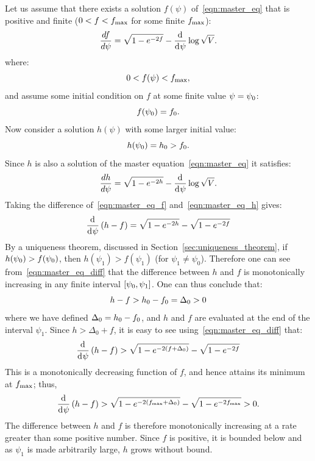 Let us assume that there exists a solution $f(\psi)$ of~\eqref{eqn:master_eq} that is positive and finite ($0<f<f_\mathrm{max}$ for some finite $f_\mathrm{max}$):
%
\begin{equation}
  \frac{d f}{d \psi} = \sqrt{1-e^{-2f}} -\frac{\operatorname{d}^{}\!{}}{\operatorname{d}^{}\!{\psi}}\log \sqrt V.
  \label{eqn:master_eq_f}
\end{equation}
%
where:
%
\begin{equation}
  0<f(\psi)<f_\mathrm{max},
\end{equation}
%
and assume some initial condition on $f$ at some finite value
$\psi=\psi_0$:
%
\begin{equation}
  f(\psi_0)=f_0.
\end{equation}
%
Now consider a solution $h(\psi)$ with some larger initial value:
%
\begin{equation}
  h(\psi_0)=h_0>f_0.
\end{equation}
%
Since $h$ is also a solution of the master equation~\eqref{eqn:master_eq} it satisfies:
%
\begin{equation}
  \frac{d h}{d \psi} = \sqrt{1-e^{-2h}} -\frac{\operatorname{d}^{}\!{}}{\operatorname{d}^{}\!{\psi}}\log \sqrt V.
  \label{eqn:master_eq_h}
\end{equation}
%
Taking the difference of~\eqref{eqn:master_eq_f} and~\eqref{eqn:master_eq_h} gives:
%
\begin{equation}
  \frac{\operatorname{d}^{}\!{}}{\operatorname{d}^{}\!{\psi}}\left(h-f\right)
  = 
  \sqrt{1-e^{-2h}}-\sqrt{1-e^{-2f}}
  \label{eqn:master_eq_diff}
\end{equation}
%
By a uniqueness theorem, discussed in Section~\ref{sec:uniqueness_theorem}, if $h(\psi_0)>f(\psi_0)$, then $h(\psi_1)>f(\psi_1)$ (for $\psi_1\ne\psi_0$). Therefore one can see from~\eqref{eqn:master_eq_diff} that the difference between $h$ and $f$ is monotonically increasing in any finite interval $[\psi_0,\psi_1]$.  One can thus conclude that:
%
\begin{equation}
  h-f>h_0-f_0=\Delta_0>0
  \label{eqn:cosh_rel}
\end{equation}
%
where we have defined $\Delta_0 = h_0-f_0$, and $h$ and $f$ are evaluated at the end of the interval $\psi_1$. Since $h>\Delta_0+f$, it is easy to see using~\eqref{eqn:master_eq_diff} that:
%
\begin{equation}
  \frac{\operatorname{d}^{}\!{}}{\operatorname{d}^{}\!{\psi}}\left(h-f\right)
  > 
  \sqrt{1-e^{-2(f+\Delta_0)}}-\sqrt{1-e^{-2f}}
\end{equation}
%
This is a monotonically decreasing function of $f$, and hence attains its minimum at $f_\mathrm{max}$; thus,
%
\begin{equation}
  \frac{\operatorname{d}^{}\!{}}{\operatorname{d}^{}\!{\psi}}\left(h-f\right)
  > 
  \sqrt{1-e^{-2(f_\mathrm{max}+\Delta_0)}}-\sqrt{1-e^{-2f_\mathrm{max}}} 
  >
  0.
\end{equation}
%
The difference between $h$ and $f$ is therefore monotonically increasing at a rate greater than some positive number. Since $f$ is positive, it is bounded below and as $\psi_1$ is made arbitrarily large, $h$ grows without bound.

